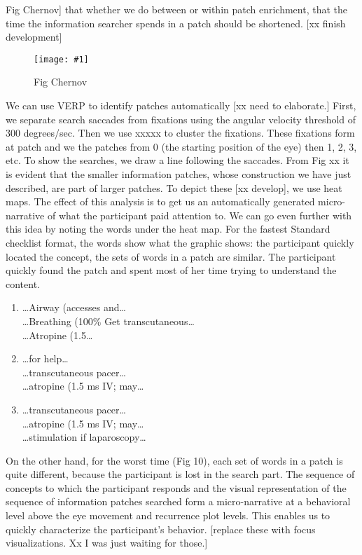\documentclass{sigchi}
\newcommand{\insertpicture}[2]{\begin{center}\texttt{[image: \#1]}\end{center}}
\begin{document}
Fig Chernov]
that whether we do between or within patch enrichment, that the time the
information searcher spends in a patch should be shortened. [xx finish
development]

\begin{figure}
	\insertpicture{figures/dummy.eps}{0.5}
	\caption{Fig Chernov\label{fig:chernov}} 
\end{figure} 

We can use VERP to identify patches automatically
[xx need to elaborate.] First, we separate search saccades from fixations
using the angular velocity threshold of 300 degrees/sec. Then we use xxxxx
to cluster the fixations. These fixations form at patch and we the patches
from 0 (the starting position of the eye) then 1, 2, 3, etc. To show the
searches, we draw a line following the saccades. From Fig xx it is evident
that the smaller information patches, whose construction we have just
described, are part of larger patches. To depict these [xx develop], we use
heat maps. The effect of this analysis is to get us an automatically
generated micro-narrative of what the participant paid attention to. We can
go even further with this idea by noting the words under the heat map. For
the fastest Standard checklist format, the words show what the graphic
shows: the participant quickly located the concept, the sets of words in a
patch are similar. The participant quickly found the patch and spent most
of her time trying to understand the content. 

\begin{enumerate}
	\item \ldots Airway (accesses and\ldots  \\
		\ldots Breathing (100\% Get transcutaneous\ldots  \\
		\ldots Atropine (1.5\ldots  
	\item	\ldots for help\ldots  \\
	\ldots transcutaneous pacer\ldots  \\
	\ldots atropine (1.5 ms IV; may\ldots  \\
	\item  \ldots transcutaneous pacer\ldots  \\
		\ldots atropine (1.5 ms IV; may\ldots  \\
    \ldots stimulation if laparoscopy\ldots 
\end{enumerate}

On the other hand, for the worst time (Fig 10), each set of words in a
patch is quite different, because the participant is lost in the search
part. The sequence of concepts to which the participant responds 
and the visual representation of the sequence of information patches 
searched form a micro-narrative at a behavioral level  above the 
eye movement and recurrence plot levels. This enables us to  quickly 
characterize the participant’s behavior. 
[replace these with focus visualizations. Xx I was just waiting for those.]
\end{document}
